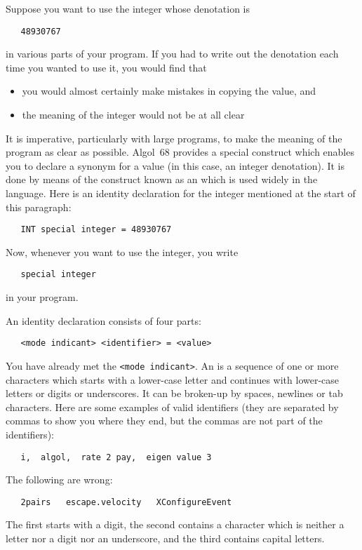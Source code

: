 Suppose you want to use the integer whose denotation is
\begin{verbatim}
   48930767
\end{verbatim}
\noindent
in various parts of your program. If you had to
write out the denotation each time you wanted to use it, you would
find that
\begin{itemize}
\item you would almost certainly make mistakes in copying the value,
and
\item the meaning of the integer would not be at all clear
\end{itemize}
It is imperative, particularly with large programs, to make the
meaning of the program as clear as possible. Algol~68 provides a
special construct which enables you to declare a synonym for a value
(in this case, an integer denotation). It is done by means of the
construct known as an
 which is
used widely in the language.  Here is an identity declaration for the
integer mentioned at the start of this paragraph:
\begin{verbatim}
   INT special integer = 48930767
\end{verbatim}
\noindent
Now, whenever you want to use the integer, you write
\begin{verbatim}
   special integer
\end{verbatim}
\noindent
in your program.

An identity declaration consists of four parts:
\begin{verbatim}
   <mode indicant> <identifier> = <value>
\end{verbatim}
\noindent
You have already met the \verb|<mode indicant>|. An 
is a sequence of one or more characters which starts with a
lower-case letter and continues with lower-case letters or digits or
underscores. It can be broken-up by spaces, newlines or tab
characters.  Here are some examples of valid identifiers (they are
separated by commas to show you where they end, but the commas are
not part of the identifiers):
\begin{verbatim}
   i,  algol,  rate 2 pay,  eigen value 3
\end{verbatim}
\noindent
The following are wrong:
\begin{verbatim}
   2pairs   escape.velocity   XConfigureEvent
\end{verbatim}
\noindent
The first starts with a digit, the second contains a character which is
neither a letter nor a digit nor an underscore, and the third contains
capital letters.

